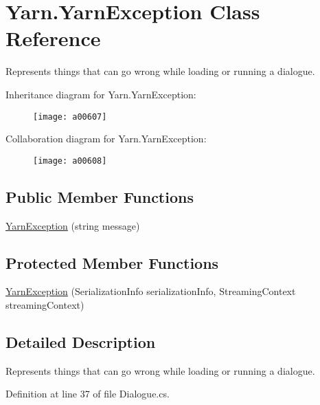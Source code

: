 \hypertarget{a00196}{\section{Yarn.\-Yarn\-Exception Class Reference}
\label{a00196}
}


Represents things that can go wrong while loading or running a dialogue.  




Inheritance diagram for Yarn.\-Yarn\-Exception\-:
\nopagebreak
\begin{figure}[H]
\begin{center}
\leavevmode
\texttt{[image: a00607]}
\end{center}
\end{figure}


Collaboration diagram for Yarn.\-Yarn\-Exception\-:
\nopagebreak
\begin{figure}[H]
\begin{center}
\leavevmode
\texttt{[image: a00608]}
\end{center}
\end{figure}
\subsection*{Public Member Functions}
\begin{DoxyCompactItemize}
\item 
\hyperlink{a00196_aa4a1dc51efdfa238aad7f20d76710fd1}{Yarn\-Exception} (string message)
\end{DoxyCompactItemize}
\subsection*{Protected Member Functions}
\begin{DoxyCompactItemize}
\item 
\hyperlink{a00196_a4230584809bc10d063385a96cc23aeb8}{Yarn\-Exception} (Serialization\-Info serialization\-Info, Streaming\-Context streaming\-Context)
\end{DoxyCompactItemize}


\subsection{Detailed Description}
Represents things that can go wrong while loading or running a dialogue. 

Definition at line 37 of file Dialogue.\-cs.



